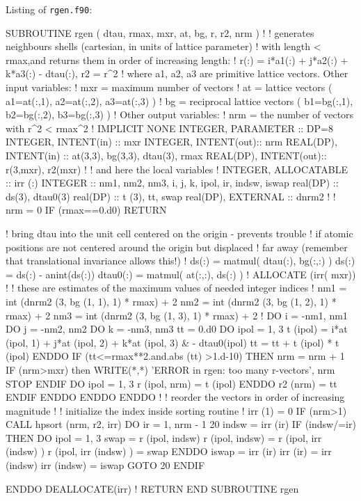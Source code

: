 Listing of {\tt rgen.f90}:
\begin{fortrancode}
SUBROUTINE rgen ( dtau, rmax, mxr, at, bg, r, r2, nrm )
  !
  !   generates neighbours shells (cartesian, in units of lattice parameter)
  !   with length < rmax,and returns them in order of increasing length:
  !      r(:) = i*a1(:) + j*a2(:) + k*a3(:) - dtau(:),   r2 = r^2
  !   where a1, a2, a3 are primitive lattice vectors. Other input variables:
  !     mxr = maximum number of vectors
  !     at  = lattice vectors ( a1=at(:,1), a2=at(:,2), a3=at(:,3) )
  !     bg  = reciprocal lattice vectors ( b1=bg(:,1), b2=bg(:,2), b3=bg(:,3) )
  !   Other output variables:
  !     nrm = the number of vectors with r^2 < rmax^2
  !
  IMPLICIT NONE
  INTEGER, PARAMETER :: DP=8
  INTEGER, INTENT(in) :: mxr
  INTEGER, INTENT(out):: nrm
  REAL(DP), INTENT(in) :: at(3,3), bg(3,3), dtau(3), rmax
  REAL(DP), INTENT(out):: r(3,mxr), r2(mxr)
  !
  !    and here the local variables
  !
  INTEGER, ALLOCATABLE :: irr (:)
  INTEGER ::  nm1, nm2, nm3, i, j, k, ipol, ir, indsw, iswap
  real(DP) :: ds(3), dtau0(3)
  real(DP) :: t (3), tt, swap
  real(DP), EXTERNAL :: dnrm2
  !
  !
  nrm = 0
  IF (rmax==0.d0) RETURN

  ! bring dtau into the unit cell centered on the origin - prevents trouble
  ! if atomic positions are not centered around the origin but displaced
  ! far away (remember that translational invariance allows this!)
  !
  ds(:) = matmul( dtau(:), bg(:,:) )
  ds(:) = ds(:) - anint(ds(:))
  dtau0(:) = matmul( at(:,:), ds(:) )
  !
  ALLOCATE (irr( mxr))
  !
  ! these are estimates of the maximum values of needed integer indices
  !
  nm1 = int (dnrm2 (3, bg (1, 1), 1) * rmax) + 2
  nm2 = int (dnrm2 (3, bg (1, 2), 1) * rmax) + 2
  nm3 = int (dnrm2 (3, bg (1, 3), 1) * rmax) + 2
  !
  DO i = -nm1, nm1
     DO j = -nm2, nm2
        DO k = -nm3, nm3
           tt = 0.d0
           DO ipol = 1, 3
              t (ipol) = i*at (ipol, 1) + j*at (ipol, 2) + k*at (ipol, 3) &
                       - dtau0(ipol)
              tt = tt + t (ipol) * t (ipol)
           ENDDO
           IF (tt<=rmax**2.and.abs (tt) >1.d-10) THEN
              nrm = nrm + 1
              IF (nrm>mxr) then 
                WRITE(*,*) 'ERROR in rgen: too many r-vectors', nrm
                STOP 
              ENDIF 
              DO ipol = 1, 3
                 r (ipol, nrm) = t (ipol)
              ENDDO
              r2 (nrm) = tt
           ENDIF
        ENDDO
     ENDDO
  ENDDO
  !
  !   reorder the vectors in order of increasing magnitude
  !
  !   initialize the index inside sorting routine
  !
  irr (1) = 0
  IF (nrm>1) CALL hpsort (nrm, r2, irr)
  DO ir = 1, nrm - 1
20   indsw = irr (ir)
     IF (indsw/=ir) THEN
        DO ipol = 1, 3
           swap = r (ipol, indsw)
           r (ipol, indsw) = r (ipol, irr (indsw) )
           r (ipol, irr (indsw) ) = swap
        ENDDO
        iswap = irr (ir)
        irr (ir) = irr (indsw)
        irr (indsw) = iswap
        GOTO 20
     ENDIF

  ENDDO
  DEALLOCATE(irr)
  !
  RETURN
END SUBROUTINE rgen
\end{fortrancode}
